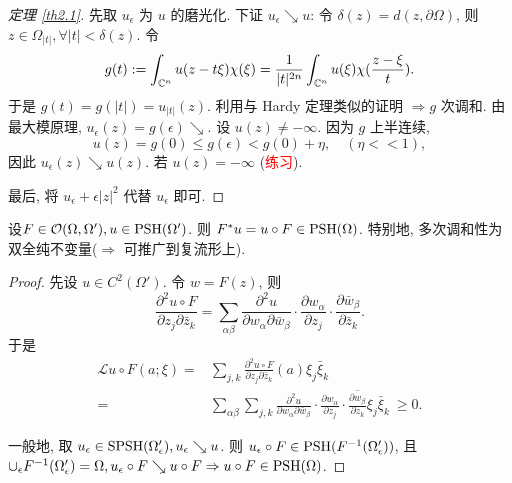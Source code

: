 \begin{proof}[定理 \ref{th2.1}]
  先取 $u_{\epsilon }$ 为 $u$ 的磨光化. 下证  
  $u_{\epsilon } \searrow u$: 令 $\delta (z)=d(z,\partial \Omega )$, 
  则 $z \in \Omega _{|t|}, \forall |t| <\delta (z)$. 
  令 
  $$ g(t):= \int_{{\mathbb C}^n} u(z-t \xi ) \chi (\xi ) = \frac{1}{|t|^{2n}}\int_{{\mathbb C}^n} u(\xi ) \chi (\frac{z-\xi }{t}).$$
  于是 $g(t)=g(|t|)=u_{|t|}(z)$. 
  利用与 Hardy 定理类似的证明 $\Rightarrow g$ 次调和.
  由最大模原理, $u_{\epsilon }(z) =g(\epsilon ) \searrow $.
  设 $u(z) \neq  - \infty $. 因为 $g$ 上半连续, 
  $$ u(z)=g(0) \leq g(\epsilon ) < g(0)+\eta , \quad(\eta <<1), $$
  因此 $u_{\epsilon }(z) \searrow u(z)$. 
  若 $u(z) = -\infty $ (\textcolor{red}{练习}).
  
  最后, 将 $u_{\epsilon }+\epsilon |z|^2$ 代替 $u_{\epsilon }$ 即可.  
\end{proof}

\begin{corollary}
  设$F \in \mathcal{O}(\Omega ,\Omega '), u \in \operatorname{PSH}(\Omega ')$. 则 $F^{*}u=u \circ F \in \operatorname{PSH} (\Omega )$.  特别地, 多次调和性为双全纯不变量($\Rightarrow $ 可推广到复流形上).
\end{corollary}
\begin{proof}
  先设 $u \in C^2(\Omega ')$. 令 $w=F(z)$, 则
  $$ \frac{\partial^2 u \circ F}{\partial z_j \partial \bar{z}_k} = \sum_{\alpha \beta }^{} \frac{\partial^2 u}{\partial w_{\alpha } \partial \bar{w}_{\beta }} \cdot  \frac{\partial w_{\alpha }}{\partial z_j} \cdot  \frac{\partial \bar{w}_{\beta }}{\partial \bar{z}_k}.$$
  于是 
  $$ \begin{aligned}
    \mathcal{L}u \circ F (a;\xi )=& \sum_{j,k} \frac{\partial^2 u \circ F}{\partial z_j \partial \bar{z}_k} (a) \xi _j \bar{\xi }_k \\
    =& \sum_{\alpha \beta } \sum_{j,k} \frac{\partial^2 u}{\partial w_{\alpha } \partial \bar{w}_{\beta }} \cdot  \frac{\partial w_{\alpha }}{\partial z_j} \cdot  \overline{\frac{\partial w_{\beta }}{\partial z_k}}  \xi _j \bar{\xi }_k ~
    \geq 0.
  \end{aligned}  $$  

  一般地, 取 $u_{\epsilon } \in \operatorname{SPSH}(\Omega_{\epsilon }^{\prime } ), u_{\epsilon }  \searrow u$.  则 $u_{\epsilon } \circ F \in \operatorname{PSH}(F^{-1}(\Omega _{\epsilon }^{\prime }))$, 且 $\cup _{\epsilon } F^{-1}(\Omega _{\epsilon }^{\prime })=\Omega, u_{\epsilon } \circ F \searrow u \circ F \Rightarrow u \circ F \in \operatorname{PSH} (\Omega )$.  
\end{proof}

